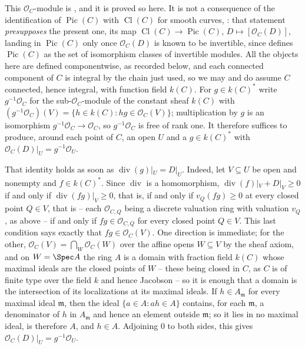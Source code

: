 \begin{definition}
This \(\mathcal O_C\)-module is
, and it is proved so
here.  It is not a consequence of the identification of
\(\operatorname{Pic}(C)\) with \(\operatorname{Cl}(C)\) for smooth
curves, : that statement
\emph{presupposes} the present one, its map
\(\operatorname{Cl}(C)\to\operatorname{Pic}(C)\),
\(D\mapsto[\mathcal O_C(D)]\), landing in \(\operatorname{Pic}(C)\)
only once \(\mathcal O_C(D)\) is known to be invertible, since
 defines \(\operatorname{Pic}(C)\) as the
set of isomorphism classes of invertible modules.  All the objects
here are defined componentwise, as recorded below, and each connected
component of \(C\) is integral by the chain just used, so we may and
do assume \(C\) connected, hence integral, with function field
\(k(C)\).  For \(g\in k(C)^*\) write
\(g^{-1}\mathcal O_C\) for the sub-\(\mathcal O_C\)-module of the
constant sheaf \(k(C)\) with
\((g^{-1}\mathcal O_C)(V)=\{h\in k(C):hg\in\mathcal O_C(V)\}\);
multiplication by \(g\) is an isomorphism
\(g^{-1}\mathcal O_C\to\mathcal O_C\), so \(g^{-1}\mathcal O_C\) is
free of rank one.  It therefore suffices to produce, around each point
of \(C\), an open \(U\) and a \(g\in k(C)^*\) with
\(\mathcal O_C(D)|_U=g^{-1}\mathcal O_U\).

That identity holds as soon as \(\operatorname{div}(g)|_U=D|_U\).
Indeed, let \(V\subseteq U\) be open and nonempty and
\(f\in k(C)^*\).  Since \(\operatorname{div}\) is a homomorphism,
\(\operatorname{div}(f)|_V+D|_V\geq0\) if and only if
\(\operatorname{div}(fg)|_V\geq0\), that is, if and only if
\(v_Q(fg)\geq0\) at every closed point \(Q\in V\), that is -- each
\(\mathcal O_{C,Q}\) being a discrete valuation ring with valuation
\(v_Q\), as above -- if and only if \(fg\in\mathcal O_{C,Q}\) for
every closed point \(Q\in V\).  This last condition says exactly that
\(fg\in\mathcal O_C(V)\).  One direction is immediate; for the other,
\(\mathcal O_C(V)=\bigcap_W\mathcal O_C(W)\) over the affine opens
\(W\subseteq V\) by the sheaf axiom, and on \(W=\Spec A\) the ring
\(A\) is a domain with fraction field \(k(C)\) whose maximal ideals
are the closed points of \(W\) -- these being closed in \(C\), as
\(C\) is of finite type over the field \(k\) and hence Jacobson -- so
it is enough that a domain is the intersection of its localizations at
its maximal ideals.  If \(h\in A_{\mathfrak m}\) for every maximal
ideal \(\mathfrak m\), then the ideal \(\{a\in A:ah\in A\}\) contains,
for each \(\mathfrak m\), a denominator of \(h\) in
\(A_{\mathfrak m}\) and hence an element outside \(\mathfrak m\); so
it lies in no maximal ideal, is therefore \(A\), and \(h\in A\).
Adjoining \(0\) to both sides, this gives
\(\mathcal O_C(D)|_U=g^{-1}\mathcal O_U\).


\end{definition}
